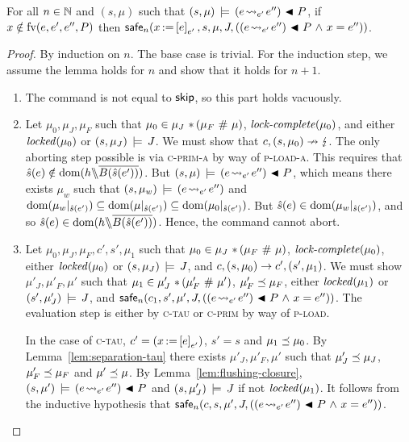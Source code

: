 \documentclass[11pt]{report}         %
\begin{document}
\begin{lemma}
      \label{lem:load-safe}
      For all $n \in \mathbb{N}$ and $(s,\mu)$ such that $(s,\mu) \,\models\, (e \!\leadsto_{e'}\! e'') \operatorname{\,\blacktriangleleft\,} P$, if $x \notin \mathrm{fv}(e,e',e'',P)$ then $\mathsf{safe}_{n}(x \operatorname{:\!=} \left[ e \right]_{e'},s,\mu,J,\left((e \!\leadsto_{e'}\! e'') \operatorname{\,\blacktriangleleft\,} P \operatorname{\,\wedge\,} x = e''\right))$. 
\end{lemma}

\begin{proof}
      By induction on $n$. The base case is trivial. For the induction step, we assume the lemma holds for $n$ and show that it holds for $n+1$.

      \begin{enumerate}
            \item The command is not equal to $\operatorname{\mathsf{skip}}$, so this part holds vacuously. 

            \item Let $\mu_0,\mu_J,\mu_F$ such that $\mu_0 \in \mu_J \operatorname{\,\ast\,} (\mu_F \operatorname{\,\#\,} \mu)$, $\text{\textit{lock-complete}}(\mu_0)$, and either $\mathit{locked}(\mu_0)$ or $(s,\mu_J) \,\models\, J$. We must show that $c,(s,\mu_0) \nrightarrow \lightning$. The only aborting step possible is via \textsc{c-prim-a} by way of \textsc{p-load-a}. This requires that $\hat{s}(e) \notin \operatorname{\mathrm{dom}}(h \backslash\!\!\backslash \overline{B(\hat{s}(e'))})$. But $(s,\mu) \,\models\, (e \!\leadsto_{e'}\! e'') \operatorname{\,\blacktriangleleft\,} P$, which means there exists $\mu_w$ such that $(s,\mu_w) \,\models\, (e \!\leadsto_{e'}\! e'')$ and $\operatorname{\mathrm{dom}}(\mu_w |_{\hat{s}(e')}) \subseteq \operatorname{\mathrm{dom}}(\mu |_{\hat{s}(e')}) \subseteq \operatorname{\mathrm{dom}}(\mu_0 |_{\hat{s}(e')})$. But $\hat{s}(e) \in \operatorname{\mathrm{dom}}(\mu_w |_{\hat{s}(e')})$, and so $\hat{s}(e) \in \operatorname{\mathrm{dom}}(h \backslash\!\!\backslash \overline{B(\hat{s}(e'))})$. Hence, the command cannot abort. 

            \item Let $\mu_0,\mu_J,\mu_F,c',s',\mu_1$ such that $\mu_0 \in \mu_J \operatorname{\,\ast\,} (\mu_F \operatorname{\,\#\,} \mu)$, $\text{\textit{lock-complete}}(\mu_0)$, either $\mathit{locked}(\mu_0)$ or $(s,\mu_J) \,\models\, J$, and $c,(s,\mu_0) \rightarrow c',(s',\mu_1)$. We must show $\mu'_J,\mu'_F,\mu'$ such that $\mu_1 \in \mu'_J \operatorname{\,\ast\,} (\mu'_F \operatorname{\,\#\,} \mu')$, $\mu'_F \preceq \mu_F$, either $\mathit{locked}(\mu_1)$ or $(s',\mu'_J) \,\models\, J$, and $\mathsf{safe}_{n}(c_1,s',\mu',J,((e \!\leadsto_{e'}\! e'') \operatorname{\,\blacktriangleleft\,} P \operatorname{\,\wedge\,} x = e''))$. The evaluation step is either by \textsc{c-tau} or \textsc{c-prim} by way of \textsc{p-load}. 

            In the case of \textsc{c-tau}, $c' = (x \operatorname{:\!=} \left[ e \right]_{e'})$, $s' = s$ and $\mu_1 \preceq \mu_0$. By Lemma~\ref{lem:separation-tau} there exists $\mu'_J,\mu'_F,\mu'$ such that $\mu'_J \preceq \mu_J$, $\mu'_F \preceq \mu_F$ and $\mu' \preceq \mu$. By Lemma~\ref{lem:flushing-closure}, $(s,\mu') \,\models\, (e \!\leadsto_{e'}\! e'') \operatorname{\,\blacktriangleleft\,} P$ and $(s,\mu'_J) \,\models\, J$ if not $\mathit{locked}(\mu_1)$. It follows from the inductive hypothesis that $\mathsf{safe}_{n}(c,s,\mu',J,((e \!\leadsto_{e'}\! e'') \operatorname{\,\blacktriangleleft\,} P \operatorname{\,\wedge\,} x = e''))$. 


\end{enumerate}
\end{proof}
\end{document}
